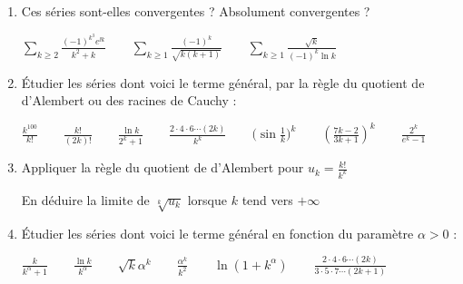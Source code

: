 \begin{frame}
\begin{miniexercice}
\begin{enumerate}

  \item Ces séries sont-elles convergentes ? Absolument convergentes ?
  
  $\displaystyle\sum_{k\geq 2} \tfrac{(-1)^{k^3}e^{\ii k}}{k^2+k}
  \qquad
  \sum_{k\geq 1} \tfrac{(-1)^k}{\sqrt{k(k+1)}}
  \qquad
  \sum_{k\geq 1} \tfrac{\sqrt k}{(-1)^k\ln k}$
  
  \item \'Etudier les séries dont voici le terme général, par la règle du quotient de d'Alembert 
  ou des racines de Cauchy :
  
  $\frac{k^{100}}{k!} \qquad \frac{k!}{(2k)!} \qquad 
  \frac{\ln k}{2^k+1} \qquad \frac{2\cdot 4 \cdot 6 \cdots (2k)}{k^k}  \qquad  \big(\sin \tfrac1k\big)^k \qquad 
  \left(\frac{7k-2}{3k+1}\right)^k \qquad \frac{2^k}{e^k-1}$
  
  
  \item Appliquer la règle du quotient de d'Alembert pour $u_k = \frac{k!}{k^k}$
  
  En déduire la limite de $\sqrt[k]{u_k}$ lorsque $k$ tend vers $+\infty$
  
  \item \'Etudier les séries dont voici le terme général en 
  fonction du paramètre $\alpha > 0$ :
  
  $\frac{k}{k^{\alpha}+1} \qquad \frac{\ln k}{k^\alpha} \qquad \sqrt{k}\alpha^k \qquad 
  \frac{\alpha^k}{k^2} \qquad \ln (1 + k^\alpha) 
  \qquad \frac{2\cdot 4 \cdot 6 \cdots (2k)}{3\cdot 5 \cdot 7 \cdots (2k+1)}
  $
\end{enumerate}
\end{miniexercice}
\end{frame}

